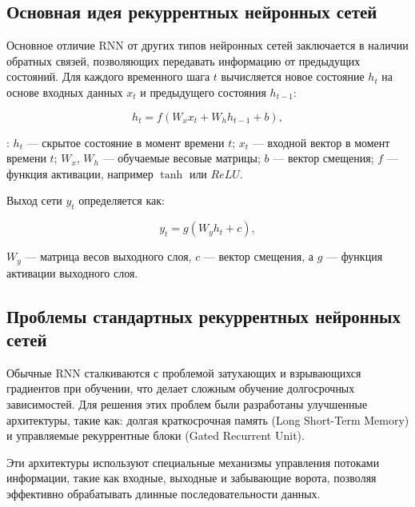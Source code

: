 \subsection{Основная идея рекуррентных нейронных сетей}
\hspace*{12.5 mm}Основное отличие RNN от других типов нейронных сетей 
заключается в наличии обратных связей, позволяющих передавать информацию от 
предыдущих состояний. Для каждого временного шага \( t \) вычисляется новое 
состояние \( h_t \) на основе входных данных \( x_t \) и предыдущего состояния 
\( h_{t-1} \):

\begin{equation}
    h_t = f(W_x x_t + W_h h_{t-1} + b),
\end{equation}

:
    \( h_t \) — скрытое состояние в момент времени \( t \);
    \( x_t \) — входной вектор в момент времени \( t \);
    \( W_x \), \( W_h \) — обучаемые весовые матрицы;
    \( b \) — вектор смещения;
    \( f \) — функция активации, например \( \tanh \) или \( ReLU \).

Выход сети \( y_t \) определяется как:

\begin{equation}
    y_t = g(W_y h_t + c),
\end{equation}

 \( W_y \) — матрица весов выходного слоя, 
\( c \) — вектор смещения, 
а \( g \) — функция активации выходного слоя.

\subsection{Проблемы стандартных рекуррентных нейронных сетей}
\hspace*{12.5 mm}Обычные RNN сталкиваются с проблемой затухающих и взрывающихся
градиентов при обучении, что делает сложным обучение долгосрочных зависимостей. 
Для решения этих проблем были разработаны улучшенные архитектуры, такие как:
долгая краткосрочная память (Long Short-Term Memory) и управляемые рекуррентные 
блоки (Gated Recurrent Unit).

Эти архитектуры используют специальные механизмы управления потоками 
информации, такие как входные, выходные и забывающие ворота, позволяя 
эффективно обрабатывать длинные последовательности данных.

